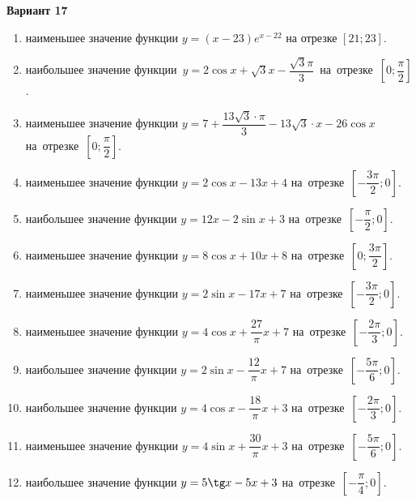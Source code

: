 \documentclass[a4paper,10pt]{article}
\begin{document}
\begin{center}\Large\textbf{Вариант 17}\end{center}

\begin{enumerate}
\item {} наименьшее значение функции $y=\left(x-23\right)e^{x-22}$ на отрезке $\left[21;23\right]$.

\item {} наибольшее значение функции~$y=2\cos x+\sqrt{3}x-\dfrac{\sqrt{3}\pi }{3}$~на~отрезке~$\left[0;\dfrac{\pi }{2}\right]$.

\item {} наименьшее значение функции $y=7+\dfrac{13\sqrt{3}\cdot \pi }{3}-13\sqrt{3}\cdot x-26\cos x$ на~отрезке~$\left[0;\dfrac{\pi }{2}\right]$.

\item {} наименьшее значение функции $y=2\cos x-13x+4$ на~отрезке~$\left[-\dfrac{3\pi }{2};0\right]$.

\item {} наибольшее значение функции $y=12x-2\sin x+3$ на~отрезке~$\left[-\dfrac{\pi }{2};0\right]$.

\item {} наименьшее значение функции $y=8\cos x+10x+8$ на~отрезке~$\left[0;\dfrac{3\pi }{2}\right]$.

\item {} наименьшее значение функции $y=2\sin x-17x+7$ на~отрезке~$\left[-\dfrac{3\pi }{2};0\right]$.

\item {} наименьшее значение функции $y=4\cos x+\dfrac{27}{\pi }x+7$ на~отрезке~$\left[-\dfrac{2\pi }{3};0\right]$.

\item {} наибольшее значение функции $y=2\sin x-\dfrac{12}{\pi }x+7$ на~отрезке~$\left[-\dfrac{5\pi }{6};0\right]$.

\item {} наибольшее значение функции $y=4\cos x-\dfrac{18}{\pi }x+3$ на~отрезке~$\left[-\dfrac{2\pi }{3};0\right]$.

\item {} наименьшее значение функции $y=4\sin x+\dfrac{30}{\pi }x+3$ на~отрезке~$\left[-\dfrac{5\pi }{6};0\right]$.

\item {} наибольшее значение функции $y=5\tg x-5x+3$ на~отрезке~$\left[-\dfrac{\pi }{4};0\right]$.


\end{enumerate}
\end{document}
